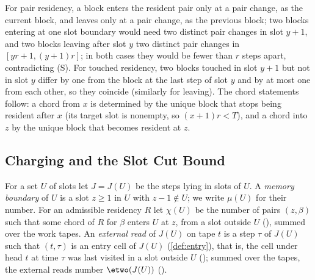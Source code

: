 \begin{outline}
For pair residency, a block enters the resident pair only at a pair change, as the current block, and
leaves only at a pair change, as the previous block; two blocks entering at one slot boundary would need two distinct pair changes in slot $y+1$, and two blocks leaving after slot $y$ two distinct pair changes in $[yr+1,(y+1)r]$; in both cases they would be fewer than $r$ steps apart, contradicting (S). For touched residency, two blocks touched
in slot $y+1$ but not in slot $y$ differ by one from the block at the last step of slot $y$ and by at most
one from each other, so they coincide (similarly for leaving). The chord statements follow: a chord from
$x$ is determined by the unique block that stops being resident after $x$ (its target slot is nonempty, so
$(x+1)r<T$), and a chord into $z$ by the unique block that becomes resident at $z$.
\end{outline}

\subsection{Charging and the Slot Cut Bound}

For a set $U$ of slots let $J=J(U)$ be the steps lying in slots of $U$. A \emph{memory boundary}
of $U$ is a slot $z\ge1$ in $U$ with $z-1\notin U$; we write $\mu(U)$ for their number. For an
admissible residency $R$ let $\chi(U)$ be the number of pairs $(z,\beta)$ such that some chord of
$R$ for $\beta$ enters $U$ at $z$, from a slot outside $U$ (), summed over the
work tapes. An \emph{external read} of $J(U)$ on tape $t$ is a step $\tau$ of $J(U)$ such that $(t,\tau)$ is
an entry cell of $J(U)$ (\cref{def:entry}), that is, the cell under head $t$ at time $\tau$ was last visited
in a slot outside $U$ (); summed over the tapes, the external reads number $\etwo(J(U))$
().

